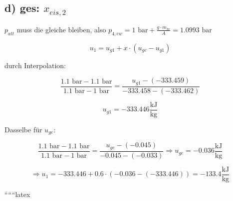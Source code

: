 \subsection*{d) ges: $x_{eis,2}$}

$p_{att}$ muss die gleiche bleiben, also $p_{4,ew} = 1 \text{ bar} + \frac{g \cdot m_{kr}}{A} = 1.0993 \text{ bar}$

\[
u_1 = u_{g1} + x \cdot (u_{ge} - u_{g1})
\]

durch Interpolation:

\[
\frac{1.1 \text{ bar} - 1.1 \text{ bar}}{1.1 \text{ bar} - 1 \text{ bar}} = \frac{u_{g1} - (-333.459)}{-333.458 - (-333.462)}
\]

\[
u_{g1} = -333.446 \frac{\text{kJ}}{\text{kg}}
\]

Dasselbe für $u_{ge}$:

\[
\frac{1.1 \text{ bar} - 1.1 \text{ bar}}{1.1 \text{ bar} - 1 \text{ bar}} = \frac{u_{ge} - (-0.045)}{-0.045 - (-0.033)} \Rightarrow u_{ge} = -0.036 \frac{\text{kJ}}{\text{kg}}
\]

\[
\Rightarrow u_1 = -333.446 + 0.6 \cdot (-0.036 - (-333.446)) = -133.4 \frac{\text{kJ}}{\text{kg}}
\]

``````latex